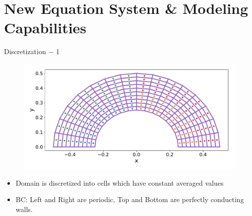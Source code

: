 \section{New Equation System \& Modeling Capabilities}

\begin{frame}[t]{Discretization $-$ 1}
 
 \vspace{-0.55cm}
  \begin{figure}[!htbp]
   \includegraphics[width=0.85\linewidth]{../fig/16x10mesh}
   \centering
 \end{figure}

 \vspace{-0.5cm}
  \begin{itemize}
    \item Domain is discretized into cells which have constant averaged values
    \item BC: Left and Right are periodic, Top and Bottom are perfectly conducting walls.
  \end{itemize}

\end{frame}


